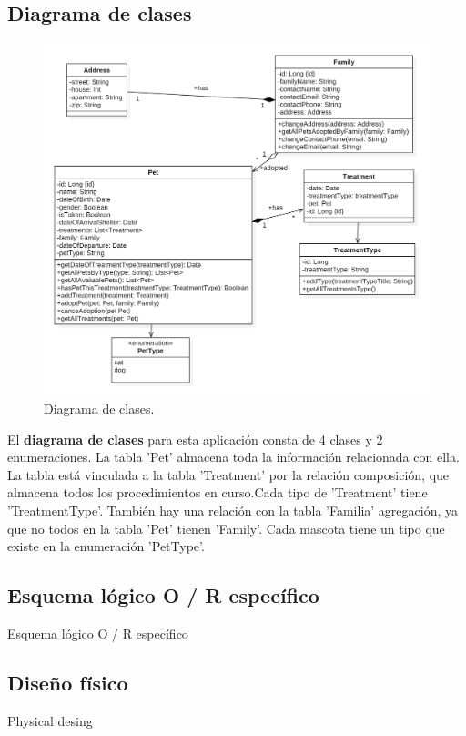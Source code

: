 \documentclass{FR16}
\begin{document}
\subsection{Diagrama de clases}
\begin{figure}[H]
\centering
\includegraphics[width=1\textwidth]{Logical View.png}
\caption{\label{fig:1}Diagrama de clases.}
\end{figure}

\newpage

El \textbf{diagrama de clases} para esta aplicación consta de 4 clases y 2 enumeraciones. La tabla 'Pet' almacena toda la información relacionada con ella. La tabla está vinculada a la tabla 'Treatment' por la relación composición, que almacena todos los procedimientos en curso.Cada tipo de 'Treatment' tiene 'TreatmentType'. También hay una relación con la tabla 'Familia' agregación, ya que no todos en la tabla 'Pet'   tienen 'Family'. Cada mascota tiene un tipo que existe en la enumeración 'PetType'.

\subsection{Esquema lógico O / R específico}
\begin{center}
Esquema lógico O / R específico
\end{center}


\subsection{Diseño físico}
\begin{center}
Physical desing
\end{center}
\newpage
\end{document}
